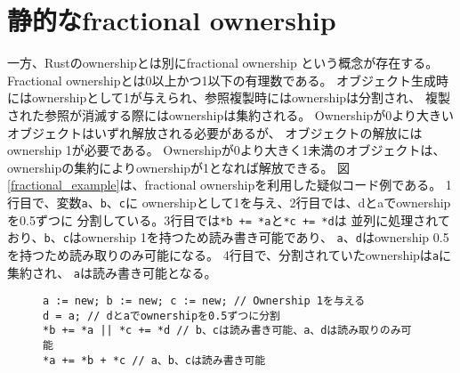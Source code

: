 \documentclass{sumiilab-paper}
\theoremstyle{mystyle}
\numberwithin{definition}{chapter} %
\begin{document}
\section{静的なfractional ownership}
一方、Rustのownershipとは別にfractional ownership\cite{DBLP:conf/sas/Boyland03}
という概念が存在する。
Fractional ownershipとは0以上かつ1以下の有理数である。
オブジェクト生成時にはownershipとして1が与えられ、参照複製時にはownershipは分割され、
複製された参照が消滅する際にはownershipは集約される。
Ownershipが0より大きいオブジェクトはいずれ解放される必要があるが、
オブジェクトの解放にはownership 1が必要である。
Ownershipが0より大きく1未満のオブジェクトは、
ownershipの集約によりownershipが1となれば解放できる。
図\ref{fractional_example}は、fractional ownershipを利用した疑似コード例である。
1行目で、変数\texttt{a}、\texttt{b}、\texttt{c}に
ownershipとして1を与え、2行目では、dとaでownershipを0.5ずつに
分割している。3行目では\texttt{*b += *a}と\texttt{*c += *d}は
並列に処理されており、\texttt{b}、\texttt{c}はownership 1を持つため読み書き可能であり、
\texttt{a}、\texttt{d}はownership 0.5を持つため読み取りのみ可能になる。
4行目で、分割されていたownershipは\texttt{a}に集約され、
\texttt{a}は読み書き可能となる。
\begin{figure}[htp]
\begin{lstlisting}[caption=Fractional ownershipの利用例, label=fractional_example, captionpos=b]
a := new; b := new; c := new; // Ownership 1を与える
d = a; // dとaでownershipを0.5ずつに分割
*b += *a || *c += *d // b、cは読み書き可能、a、dは読み取りのみ可能
*a += *b + *c // a、b、cは読み書き可能
\end{lstlisting}
\end{figure}
\end{document}
